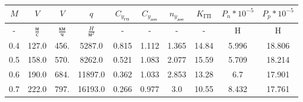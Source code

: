 \begin{tabular}{|c|c|c|c|c|c|c|c|c|c|}
\hline
$M$ & $V$ & $V$ & $q$ & $C_{y_{ГП}}$ & $C_{y_{доп}}$ & $n_{y_{доп}}$ & $K_{ГП}$ & $P_{n}*10^{-5}$ & $P_{p}*10^{-5}$ \\ 
\hline
- & $\frac{м}{с}$ & $\frac{км}{ч}$ & $\frac{H}{м^2}$ & - & - & - & - & H & H \\ 
\hline
0.4 & 127.0 & 456. & 5287.0 & 0.815 & 1.112 & 1.365 & 14.84 & 5.996 & 18.806 \\ 
\hline
0.5 & 158.0 & 570. & 8262.0 & 0.521 & 1.083 & 2.077 & 15.59 & 5.709 & 18.214 \\ 
\hline
0.6 & 190.0 & 684. & 11897.0 & 0.362 & 1.033 & 2.853 & 13.28 & 6.7 & 17.901 \\ 
\hline
0.7 & 222.0 & 797. & 16193.0 & 0.266 & 0.977 & 3.0 & 10.55 & 8.432 & 17.761 \\ 
\hline
\end{tabular}